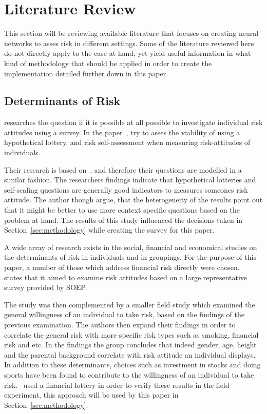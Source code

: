 \documentclass[12pt]{article}
\begin{document}
\section{Literature Review}
\label{sec:literature_review}

This section will be reviewing available literature that focuses on creating neural networks to asses risk in different settings. Some of the literature reviewed here do not directly apply to the case at hand, yet yield useful information in what kind of methodology that should be applied in order to create the implementation detailed further down in this paper.

\subsection{Determinants of Risk}
\label{sub:determinants_riks}

\cite{dp4807.pdf} researches the question if it is possible at all possible to investigate individual risk attitudes using a survey. In the paper~\cite{dp4807.pdf}, try to asses the viability of using a hypothetical lottery, and risk self-assessment when measuring risk-attitudes of individuals. 

Their research is based on~\cite{individualRiskAttitudes}, and therefore their questions are modelled in a similar fashion. The researchers findings indicate that hypothetical lotteries and self-scaling questions are generally good indicators to measures someones risk attitude. The author though argue, that the heterogeneity of the results point out that it might be better to use more context specific questions based on the problem at hand. The results of this study influenced the decisions taken in Section~\ref{sec:methodology} while creating the survey for this paper.

A wide array of research exists in the social, financial and economical studies on the determinants of risk in individuals and in groupings. For the purpose of this paper, a number of those which address financial risk directly were chosen.~\cite{individualRiskAttitudes} states that it aimed to examine risk attitudes based on a large representative survey provided by SOEP\@. 

The study was then complemented by a smaller field study which examined the general willingness of an individual to take risk, based on the findings of the previous examination. The authors then expand their findings in order to correlate the general risk with more specific risk types such as smoking, financial risk and etc. In the findings the group concludes that indeed gender, age, height and the parental background correlate with risk attitude an individual displays. In addition to these determinants, choices such as investment in stocks and doing sports have been found to contribute to the willingness of an individual to take risk.~\cite{individualRiskAttitudes} used a financial lottery in order to verify these results in the field experiment, this approach will be used by this paper in Section~\ref{sec:methodology}.
\end{document}
